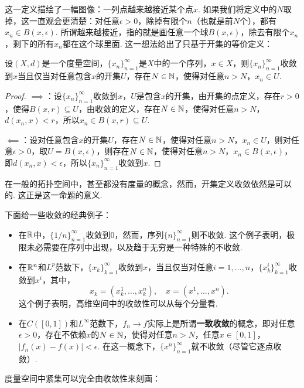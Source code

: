 这一定义描绘了一幅图像：一列点越来越接近某个点$x$. 如果我们将定义中的$N$取掉，这一直观会更清楚：对任意$\epsilon>0$，除掉有限个$n$（也就是前$N$个），都有$x_n\in B(x,\epsilon)$. 所谓越来越接近，指的就是画任意一个球$B(x,\epsilon)$，除去有限个$x_n$，剩下的所有$x_n$都在这个球里面. 这一想法给出了只基于开集的等价定义：

\begin{proposition}\label{proposition:converge-ball}
    设$(X,d)$是一个度量空间，$\{x_n\}_{n=1}^\infty$是$X$中的一个序列，$x\in X$，则$\{x_n\}_{n=1}^\infty$收敛到$x$当且仅当对任意包含$x$的开集$U$，存在$N\in\mathbb{N}$，使得对任意$n>N$，$x_n\in U$.
\end{proposition}
\begin{proof}
    $\implies$：设$\{x_n\}_{n=1}^\infty$收敛到$x$，$U$是包含$x$的开集，由开集的点定义，存在$r>0$，使得$B(x,r)\subseteq U$，由收敛的定义，存在$N\in\mathbb{N}$，使得对任意$n>N$，$d(x_n,x)<r$，所以$x_n\in B(x,r)\subseteq U$.

    $\impliedby$：设对任意包含$x$的开集$U$，存在$N\in\mathbb{N}$，使得对任意$n>N$，$x_n\in U$，则对任意$\epsilon>0$，取$U=B(x,\epsilon)$，则存在$N\in\mathbb{N}$，使得对任意$n>N$，$x_n\in B(x,\epsilon)$，即$d(x_n,x)<\epsilon$，所以$\{x_n\}_{n=1}^\infty$收敛到$x$.
\end{proof}

在一般的拓扑空间中，甚至都没有度量的概念，然而，开集定义收敛依然是可以的. 这正是这一命题的意义. 

下面给一些收敛的经典例子：
\begin{example}
\begin{itemize}
    \item 在$\mathbb{R}$中，$\{1/n\}_{n=1}^\infty$收敛到$0$，然而，序列$\{n\}_{n=1}^\infty$则不收敛. 这个例子表明，极限未必需要在序列中出现，以及趋于无穷是一种特殊的不收敛.
    \item 在$\mathbb{R}^n$和$L^p$范数下，$\{x_k\}_{k=1}^\infty$收敛到$x$，当且仅当对任意$i=1,\dots,n$，$\{x_k^i\}_{k=1}^\infty$收敛到$x^i$，其中，
    \[x_k=(x_k^1,\dots,x_k^n),\quad x=(x^1,\dots,x^n).\]
    这个例子表明，高维空间中的收敛性可以从每个分量看. 
    \item 在$C([0,1])$和$L^\infty$范数下，$f_n\to f$实际上是所谓\textbf{一致收敛}的概念，即对任意$\epsilon>0$，存在不依赖$x$的$N\in\mathbb{N}$，使得对任意$n>N$，任意$x\in[0,1]$，$|f_n(x)-f(x)|<\epsilon$. 在这一概念下，$\{x^n\}_{n=1}^\infty$就不收敛（尽管它逐点收敛）. 
\end{itemize}
\end{example}

度量空间中紧集可以完全由收敛性来刻画：

